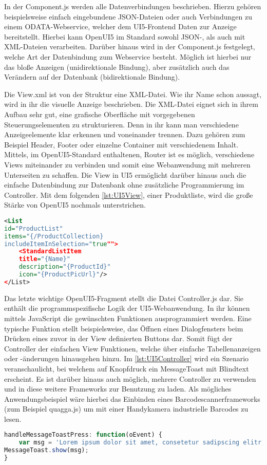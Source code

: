 In der Component.js werden alle Datenverbindungen beschrieben. Hierzu gehören beispielsweise einfach eingebundene JSON-Dateien oder auch Verbindungen zu einem ODATA-Webservice, welcher dem UI5-Frontend Daten zur Anzeige bereitstellt. Hierbei kann OpenUI5 im Standard sowohl JSON-, als auch mit XML-Dateien verarbeiten. Darüber hinaus wird in der Component.js festgelegt, welche Art der Datenbindung zum Webservice besteht. Möglich ist hierbei nur das bloße Anzeigen (unidirektionale Bindung), aber zusätzlich auch das Verändern auf der Datenbank (bidirektionale Bindung).

Die View.xml ist von der Struktur eine XML-Datei. Wie ihr Name schon aussagt, wird in ihr die visuelle Anzeige beschrieben. Die XML-Datei eignet sich in ihrem Aufbau sehr gut, eine grafische Oberfläche mit vorgegebenen Steuerungselementen zu strukturieren. Denn in ihr kann man verschiedene Anzeigeelemente klar erkennen und voneinander trennen. Dazu gehören zum Beispiel Header, Footer oder einzelne Container mit verschiedenem Inhalt. Mittels, im OpenUI5-Standard enthaltenen, Router ist es möglich, verschiedene Views miteinander zu verbinden und somit eine Webanwendung mit mehreren Unterseiten zu schaffen. Die View in UI5 ermöglicht darüber hinaus auch die einfache Datenbindung zur Datenbank ohne zusätzliche Programmierung im Controller. Mit dem folgenden \autoref{lst:UI5View}, einer Produktliste, wird die große Stärke von OpenUI5 nochmals unterstrichen.

\begin{lstlisting}[caption=Beispiel OpenUI5 View, label=lst:UI5View, language=XML]
<List
id="ProductList"
items="{/ProductCollection}
includeItemInSelection="true"">
	<StandardListItem
	title="{Name}"
	description="{ProductId}"
	icon="{ProductPicUrl}"/>
</List>
\end{lstlisting}

Das letzte wichtige OpenUI5-Fragment stellt die Datei Controller.js dar. Sie enthält die programmspezifische Logik der UI5-Webanwendung. In ihr können mittels JavaScript die gewünschten Funktionen ausprogrammiert werden. Eine typische Funktion stellt beispielsweise, das Öffnen eines Dialogfensters beim Drücken eines zuvor in der View definierten Buttons dar. Somit fügt der Controller der einfachen View Funktionen, welche über einfache Tabellenanzeigen oder -änderungen hinausgehen hinzu. Im \autoref{lst:UI5Controller} wird ein Szenario veranschaulicht, bei welchem auf Knopfdruck ein MessageToast mit Blindtext erscheint. Es ist darüber hinaus auch möglich, mehrere Controller zu verwenden und in diese weitere Frameworks zur Benutzung zu laden. Als mögliches Anwendungsbeispiel wäre hierbei das Einbinden eines Barcodescannerframeworks (zum Beispiel quagga.js) um mit einer Handykamera industrielle Barcodes zu lesen. 

\begin{lstlisting}[caption=Beispiel OpenUI5 Controller, label=lst:UI5Controller, language=Javascript]
handleMessageToastPress: function(oEvent) {
	var msg = 'Lorem ipsum dolor sit amet, consetetur sadipscing elitr, sed diam nonumy\r\n eirmod.';
MessageToast.show(msg);
}
\end{lstlisting}